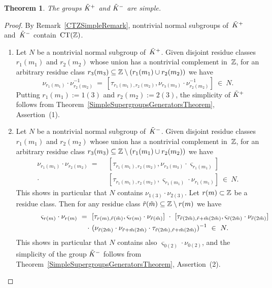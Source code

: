 \documentclass{amsart}
\theoremstyle{definition} \newtheorem{CTZDefinition}{Definition}[section]
\theoremstyle{plain}      \newtheorem{CTZPropertiesTheorem}[CTZDefinition]{Theorem}
\theoremstyle{plain}      \newtheorem{CTZSubgroupsTheorem}[CTZDefinition]{Theorem}
\theoremstyle{definition} \newtheorem{RcwaMappingDefinition}{Definition}[section]
\theoremstyle{definition} \newtheorem{RCWADefinition}[RcwaMappingDefinition]{Definition}
\theoremstyle{plain}      \newtheorem{CTZNotFinitelyGeneratedTheorem}
\theoremstyle{definition} \newtheorem{CTZSmEmbeddingDefinition}[RcwaMappingDefinition]{Definition}
\theoremstyle{plain}      \newtheorem{CTZHighlyTransitiveTheorem}[RcwaMappingDefinition]{Theorem}
\theoremstyle{plain}      \newtheorem{CTZTorsionElementsDivisibleTheorem}
\theoremstyle{plain}      \newtheorem{CTLemma}{Lemma}[section]
\theoremstyle{plain}      \newtheorem{IntegralCommutatorLemma}[CTLemma]{Lemma}
\theoremstyle{plain}      \newtheorem{NormalSubgroupContainsIntegralElementLemma}[CTLemma]{Lemma}
\theoremstyle{plain}      \newtheorem{CTZSimpleTheorem}[CTLemma]{Theorem}
\theoremstyle{remark}     \newtheorem{CTZSimpleRemark}[CTLemma]{Remark}
\theoremstyle{definition} \newtheorem{CTPZDefinition}[CTLemma]{Definition}
\theoremstyle{plain}      \newtheorem{CTPZSimpleCorollary}[CTLemma]{Corollary}
\theoremstyle{plain}      \newtheorem{CTPZSimpleProblem}[CTLemma]{Problem}
\theoremstyle{plain}      \newtheorem{FnPSL2ZEmbeddingTheorem}{Theorem}[section]
\theoremstyle{plain}      \newtheorem{FreeProductEmbeddingTheorem}[FnPSL2ZEmbeddingTheorem]{Theorem}
\theoremstyle{definition} \newtheorem{RestrictionMonomorphismDefinition}
\theoremstyle{plain}      \newtheorem{DirectAndWreathProductsEmbeddingTheorem}
\theoremstyle{plain}      \newtheorem{DirectAndWreathProductsEmbeddingCorollary}
\theoremstyle{definition} \newtheorem{CTintZDefinition}[FnPSL2ZEmbeddingTheorem]{Definition}
\theoremstyle{plain}      \newtheorem{CTintZSimpleTheorem}[FnPSL2ZEmbeddingTheorem]{Theorem}
\theoremstyle{definition} \newtheorem{KernelDefinition}{Definition}[section]
\theoremstyle{definition} \newtheorem{TameWildDefinition}[KernelDefinition]{Definition}
\theoremstyle{definition} \newtheorem{SimpleSupergroupsDefinition}[KernelDefinition]{Definition}
\theoremstyle{definition} \newtheorem{CSCRDefinition}[KernelDefinition]{Definition}
\theoremstyle{plain}      \newtheorem{SimpleSupergroupsGeneratorsTheorem}[KernelDefinition]{Theorem}
\theoremstyle{plain}      \newtheorem{SimpleSupergroupsTheorem}[KernelDefinition]{Theorem}
\theoremstyle{plain}      \newtheorem{SimpleSupergroupsTransitivityTheorem}
\theoremstyle{plain}      \newtheorem{TameGenerationConjecture}[KernelDefinition]{Conjecture}
\theoremstyle{remark}     \newtheorem{TameGenerationRemark}[KernelDefinition]{Remark}
\begin{document}
\begin{SimpleSupergroupsTheorem} \label{SimpleSupergroupsTheorem}
  The groups \(\tilde{K}^+\) and \(\tilde{K}^-\) are simple.
\end{SimpleSupergroupsTheorem}
\begin{proof}
  By Remark~\ref{CTZSimpleRemark}, nontrivial normal subgroups of~\(\tilde{K}^+\) and~\(\tilde{K}^-\)
  contain~\(\CT{\ZZ}\).
  \begin{enumerate}

    \item Let \(N\) be a nontrivial normal subgroup of~\(\tilde{K}^+\). Given disjoint residue classes
          \(r_1(m_1)\) and \(r_2(m_2)\) whose union has a nontrivial complement in~\(\mathbb{Z}\), for an
          arbitrary residue class \(r_3(m_3) \subseteq \mathbb{Z} \setminus (r_1(m_1) \cup r_2(m_2))\)
          we have
          \[
            \nu_{r_1(m_1)} \cdot \nu_{r_2(m_2)}^{-1} \ = \
            [\tau_{r_1(m_1),r_2(m_2)},\nu_{r_3(m_3)} \cdot \nu_{r_2(m_2)}^{-1}] \ \in \ N.
          \]
          Putting \(r_1(m_1) := 1(3)\) and \(r_2(m_2) := 2(3)\), the simplicity of \(\tilde{K}^+\)
          follows from Theorem~\ref{SimpleSupergroupsGeneratorsTheorem}, Assertion~(1).

    \item Let \(N\) be a nontrivial normal subgroup of~\(\tilde{K}^-\). Given disjoint residue classes
          \(r_1(m_1)\) and \(r_2(m_2)\) whose union has a nontrivial complement in~\(\mathbb{Z}\), for an
          arbitrary residue class \(r_3(m_3) \subseteq \mathbb{Z} \setminus (r_1(m_1) \cup r_2(m_2))\)
          we have
          \begin{align*}
            \nu_{r_1(m_1)} \cdot \nu_{r_2(m_2)} \ = \ \
            &[\tau_{r_1(m_1),r_2(m_2)},\nu_{r_3(m_3)} \cdot \varsigma_{r_1(m_1)}] \\
            \cdot \ &[\tau_{r_1(m_1),r_2(m_2)},\varsigma_{r_1(m_1)} \cdot \nu_{r_1(m_1)}] \ \in \ N.
          \end{align*}
          This shows in particular that \(N\) contains \(\nu_{1(3)} \cdot \nu_{2(3)}\).
          Let \(r(m) \subset \mathbb{Z}\) be a residue class.
          Then for any residue class \(\tilde{r}(\tilde{m}) \subseteq \mathbb{Z} \setminus r(m)\) we have
          \begin{align*}
            \hspace{12mm} \varsigma_{r(m)} \cdot \nu_{r(m)} \ = \ \
            &[\tau_{r(m),\ti{r}(\ti{m})},\varsigma_{r(m)} \cdot \nu_{\ti{r}(\ti{m})}] \
            \cdot \ [\tau_{\ti{r}(2\ti{m}),\ti{r}+\ti{m}(2\ti{m})},
            \varsigma_{\ti{r}(2\ti{m})} \cdot \nu_{\ti{r}(2\ti{m})}] \\
            \cdot \ &(\nu_{\ti{r}(2\ti{m})} \cdot \nu_{\ti{r}+\ti{m}(2\ti{m})} \cdot
            \tau_{\ti{r}(2\ti{m}),\ti{r}+\ti{m}(2\ti{m})})^{-1} \ \in \ N.
          \end{align*}
          This shows in particular that \(N\) contains also \(\varsigma_{0(2)} \cdot \nu_{0(2)}\),
          and the simplicity of the group \(\tilde{K}^-\) follows from
          Theorem~\ref{SimpleSupergroupsGeneratorsTheorem}, Assertion~(2).


\end{enumerate}
\end{proof}
\end{document}

